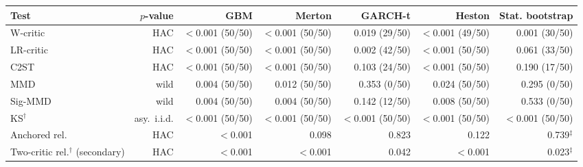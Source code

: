 \begin{tabular}{lrrrrrr}
\toprule
Test & $p$-value & GBM & Merton & GARCH-t & Heston & Stat. bootstrap \\
\midrule
W-critic & HAC & $<$0.001 (50/50) & $<$0.001 (50/50) & 0.019 (29/50) & $<$0.001 (49/50) & 0.001 (30/50) \\
LR-critic & HAC & $<$0.001 (50/50) & $<$0.001 (50/50) & 0.002 (42/50) & $<$0.001 (50/50) & 0.061 (33/50) \\
C2ST & HAC & $<$0.001 (50/50) & $<$0.001 (50/50) & 0.103 (24/50) & $<$0.001 (50/50) & 0.190 (17/50) \\
MMD & wild & 0.004 (50/50) & 0.012 (50/50) & 0.353 (0/50) & 0.024 (50/50) & 0.295 (0/50) \\
Sig-MMD & wild & 0.004 (50/50) & 0.004 (50/50) & 0.142 (12/50) & 0.008 (50/50) & 0.533 (0/50) \\
KS$^{\dagger}$ & asy.\ i.i.d. & $<$0.001 (50/50) & $<$0.001 (50/50) & $<$0.001 (50/50) & $<$0.001 (50/50) & $<$0.001 (50/50) \\
Anchored rel. & HAC & $<$0.001 & 0.098 & 0.823 & 0.122 & 0.739$^{\ddagger}$ \\
Two-critic rel.$^{\dagger}$ (secondary) & HAC & $<$0.001 & $<$0.001 & 0.042 & $<$0.001 & 0.023$^{\ddagger}$ \\
\bottomrule
\end{tabular}
